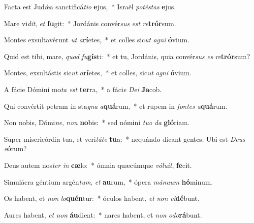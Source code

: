 \item Facta est Judǽa sanctificá\textit{ti}\textit{o} \textbf{e}jus,~* Israël \textit{pot}\textit{és}\textit{tas} \textbf{e}jus.

\item Mare vi\textit{dit}, \textit{et} \textbf{fu}git:~* Jordánis convér\textit{sus} \textit{est} \textit{re}\textbf{trór}sum.

\item Montes exsultavérunt \textit{ut} \textit{a}\textbf{rí}etes,~* et colles sic\textit{ut} \textit{a}\textit{gni} \textbf{ó}vium.

\item Quid est tibi, mare, \textit{quod} \textit{fu}\textbf{gís}ti:~* et tu, Jordánis, quia convér\textit{sus} \textit{es} \textit{re}\textbf{trór}sum?

\item Montes, exsultástis sic\textit{ut} \textit{a}\textbf{rí}etes,~* et colles, sic\textit{ut} \textit{a}\textit{gni} \textbf{ó}vium.

\item A fácie Dómini mo\textit{ta} \textit{est} \textbf{ter}ra,~* a fáci\textit{e} \textit{De}\textit{i} \textbf{Ja}cob.

\item Qui convértit petram in sta\textit{gna} \textit{a}\textbf{quá}rum,~* et rupem in \textit{fon}\textit{tes} \textit{a}\textbf{quá}rum.

\item Non nobis, Dómi\textit{ne}, \textit{non} \textbf{no}bis:~* sed nómini \textit{tu}\textit{o} \textit{da} \textbf{gló}riam.

\item Super misericórdia tua, et veri\textit{tá}\textit{te} \textbf{tu}a:~* nequándo dicant gentes: Ubi est \textit{De}\textit{us} \textit{e}\textbf{ó}rum?

\item Deus autem nos\textit{ter} \textit{in} \textbf{cæ}lo:~* ómnia quæcúmque \textit{vó}\textit{lu}\textit{it}, \textbf{fe}cit.

\item Simulácra géntium argén\textit{tum}, \textit{et} \textbf{au}rum,~* ópera \textit{má}\textit{nu}\textit{um} \textbf{hó}minum.

\item Os habent, et \textit{non} \textit{lo}\textbf{quén}tur:~* óculos habent, \textit{et} \textit{non} \textit{vi}\textbf{dé}bunt.

\item Aures habent, \textit{et} \textit{non} \textbf{áu}dient:~* nares habent, et \textit{non} \textit{o}\textit{do}\textbf{rá}bunt.

